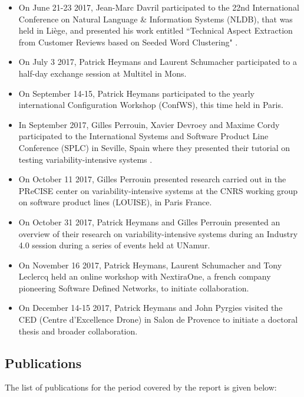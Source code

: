 \begin{itemize}
   \item On June 21-23 2017, Jean-Marc Davril participated to the 22nd International Conference on Natural Language \& Information Systems (NLDB), that was held in Li{\`e}ge, and presented his work entitled ``Technical Aspect Extraction from Customer Reviews based on Seeded Word Clustering" \cite{Davril17}.  
   
   \item On July 3 2017, Patrick Heymans and Laurent Schumacher participated to a half-day exchange session at Multitel in Mons.
   
   \item On September 14-15, Patrick Heymans participated to the yearly international Configuration Workshop (ConfWS), this time held in Paris.
   
   	\item  In September 2017, Gilles Perrouin, Xavier Devroey and Maxime Cordy participated to the International Systems and Software Product Line Conference (SPLC) in Seville, Spain where they presented their tutorial on testing variability-intensive systems \cite{DBLP:conf/splc/PerrouinDC17}. 
   
	\item On October 11 2017, Gilles Perrouin presented research carried out in the PReCISE center on variability-intensive systems at the CNRS working group on software product lines (LOUISE), in Paris France.
    
    \item On October 31 2017, Patrick Heymans and Gilles Perrouin presented an overview of their research on variability-intensive systems during an Industry 4.0 session during a series of events held at UNamur.
    
    \item On November 16 2017, Patrick Heymans, Laurent Schumacher and Tony Leclercq held an online workshop with NextiraOne, a french company pioneering Software Defined Networks, to initiate collaboration.
    
    \item On December 14-15 2017, Patrick Heymans and John Pyrgies visited the CED (Centre d'Excellence Drone) in Salon de Provence to initiate a doctoral thesis and broader collaboration.
  

\end{itemize}


\subsection{Publications}

The list of publications for the period covered by the report is given below: 

\nocite{*}
\printbibliography[heading={none}]